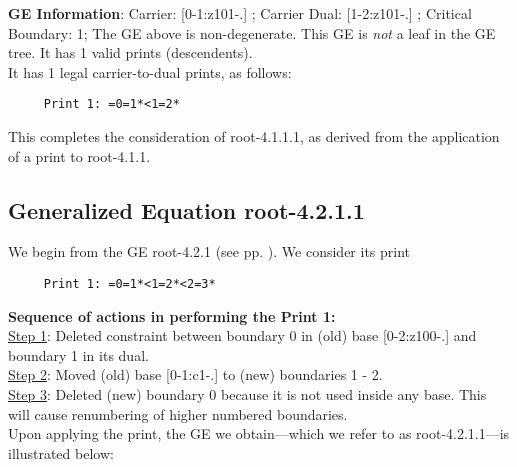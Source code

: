 \documentclass[final]{article}
\begin{document}
{\bf GE Information}:  
Carrier: [0-1:z101-.] ;  
Carrier Dual: [1-2:z101-.] ;  
Critical Boundary: 1;  
The GE above is non-degenerate.  This GE is {\em not} a leaf in the GE tree.   It has 1 valid prints (descendents).  \\[0.1in]
   It has 1 legal carrier-to-dual prints, as follows:
\begin{verbatim}
     Print 1: =0=1*<1=2*
\end{verbatim}
This completes the consideration of root-4.1.1.1, as derived from the application of a print to root-4.1.1.\\[0.1in]
\subsection*{Generalized Equation root-4.2.1.1}
\label{root-4.2.1.1}We begin from the GE root-4.2.1 (see pp. \pageref{root-4.2.1}).  {We consider its print}
\begin{verbatim}
     Print 1: =0=1*<1=2*<2=3*
\end{verbatim}
{\bf Sequence of actions in performing the Print 1:}\\
{\underline{Step 1}:} Deleted constraint between boundary 0 in (old) base [0-2:z100-.]  and boundary 1 in its dual.\\
{\underline{Step 2}:} Moved (old) base [0-1:c1-.]  to (new) boundaries 1 - 2.\\
{\underline{Step 3}:} Deleted (new) boundary 0 because it is not used inside any base.  This will cause renumbering of higher numbered boundaries.
\\[0.1in]
{Upon applying the print, the GE we obtain---which we refer to as root-4.2.1.1---is illustrated below:}
\end{document}

